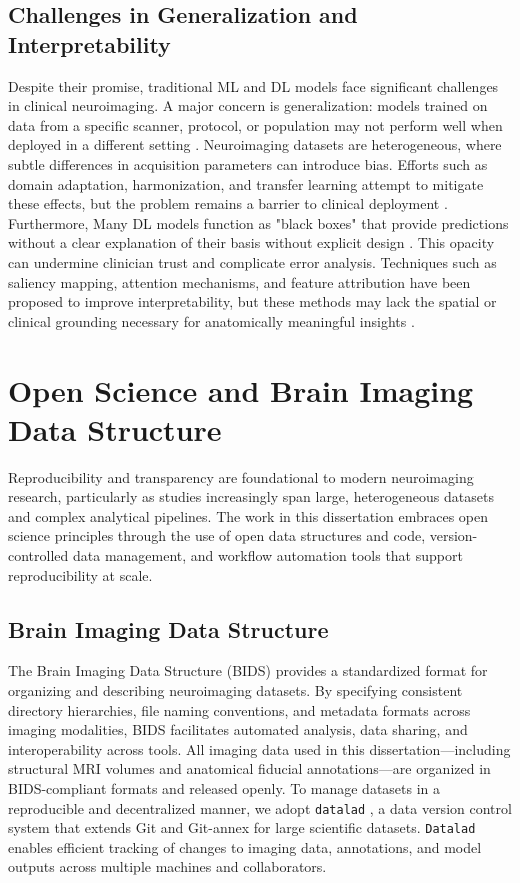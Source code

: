 \subsection{Challenges in Generalization and Interpretability}
Despite their promise, traditional ML and DL models face significant challenges in clinical neuroimaging. A major concern is generalization: models trained on data from a specific scanner, protocol, or population may not perform well when deployed in a different setting \cite{Davatzikos2019-zq}. Neuroimaging datasets are heterogeneous, where subtle differences in acquisition parameters can introduce bias. Efforts such as domain adaptation, harmonization, and transfer learning attempt to mitigate these effects, but the problem remains a barrier to clinical deployment \cite{Iglesias2023-co}. Furthermore, Many DL models function as "black boxes" that provide predictions without a clear explanation of their basis without explicit design \cite{Holzinger2019-kw}. This opacity can undermine clinician trust and complicate error analysis. Techniques such as saliency mapping, attention mechanisms, and feature attribution have been proposed to improve interpretability, but these methods may lack the spatial or clinical grounding necessary for anatomically meaningful insights \cite{Dinsdale2022-hf}.

\section{Open Science and Brain Imaging Data Structure}

Reproducibility and transparency are foundational to modern neuroimaging research, particularly as studies increasingly span large, heterogeneous datasets and complex analytical pipelines. The work in this dissertation embraces open science principles through the use of open data structures and code, version-controlled data management, and workflow automation tools that support reproducibility at scale.

\subsection{Brain Imaging Data Structure}

The Brain Imaging Data Structure (BIDS) \cite{Gorgolewski2016-oh} provides a standardized format for organizing and describing neuroimaging datasets. By specifying consistent directory hierarchies, file naming conventions, and metadata formats across imaging modalities, BIDS facilitates automated analysis, data sharing, and interoperability across tools. All imaging data used in this dissertation—including structural MRI volumes and anatomical fiducial annotations—are organized in BIDS-compliant formats and released openly. To manage datasets in a reproducible and decentralized manner, we adopt \texttt{datalad} \cite{Halchenko2021-px}, a data version control system that extends Git and Git-annex for large scientific datasets. \texttt{Datalad} enables efficient tracking of changes to imaging data, annotations, and model outputs across multiple machines and collaborators.

